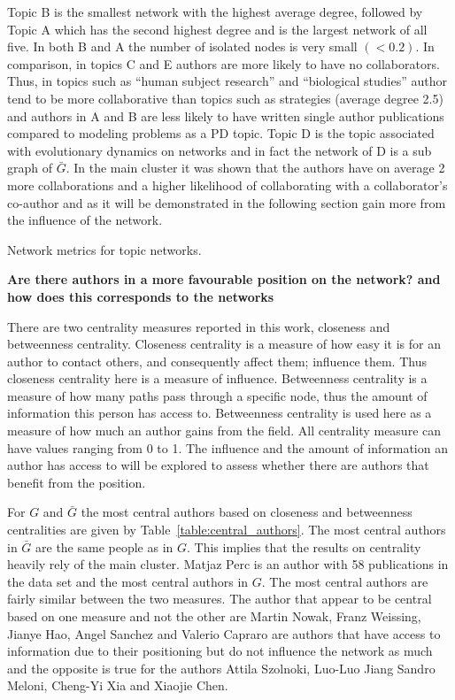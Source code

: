 \documentclass{article}
\theoremstyle{definition}
\begin{document}
Topic B is the smallest network with the highest average degree, followed by
Topic A which has the second highest degree and is the largest network of all
five. In both B and A the number of isolated nodes is very small \((<0.2)\). In
comparison, in topics C and E authors are more likely to have no collaborators. Thus, in
topics such as ``human subject research'' and ``biological studies'' author tend to be
more collaborative than topics such as strategies (average degree 2.5) and
authors in A and B are less likely to have written single author publications
compared to modeling problems as a PD topic. Topic D is the topic associated
with evolutionary dynamics on networks and in fact the network of D is a
sub graph of \(\bar{G}\). In the main cluster it was shown that the authors have
on average 2 more collaborations and a higher likelihood of collaborating with a
collaborator's co-author and as it will be demonstrated in the following
section gain more from the influence of the network.

\begin{table}[H]
    \centering
    \resizebox{\textwidth}{!}{
    }
    \caption{Network metrics for topic networks.}\label{table:topics_networks}
\end{table}


\textbf{Are there authors in a more favourable position on the network? and
how does this corresponds to the networks}

There are two centrality measures reported in this work, closeness and
betweenness centrality. Closeness centrality is a measure of how easy it is for
an author to contact others, and consequently affect them; influence them. Thus
closeness centrality here is a measure of influence. Betweenness centrality is a
measure of how many paths pass through a specific node, thus the amount of
information this person has access to. Betweenness centrality is used here as a
measure of how much an author gains from the field. All centrality measure can
have values ranging from 0 to 1. The influence and the amount of information
an author has access to will be explored to assess whether there are authors
that benefit from the position.

For \(G\) and \(\bar{G}\) the most central authors based on closeness and
betweenness centralities are given by Table~\ref{table:central_authors}.
The most central authors in \(\bar{G}\) are the same people as in \(G\). This
implies that
the results on centrality heavily rely of the main cluster.
Matjaz
Perc is an author with 58 publications in the data set and the most central
authors in \(G\). The most central authors are fairly similar between the two
measures. The author that appear to be central based on one measure and not the
other are Martin Nowak, Franz Weissing, Jianye Hao, Angel Sanchez and Valerio
Capraro are authors that have access to information due to their positioning but
do not influence the network as much and the opposite is true for the authors
Attila Szolnoki, Luo-Luo Jiang Sandro Meloni, Cheng-Yi Xia and Xiaojie Chen.
\end{document}
